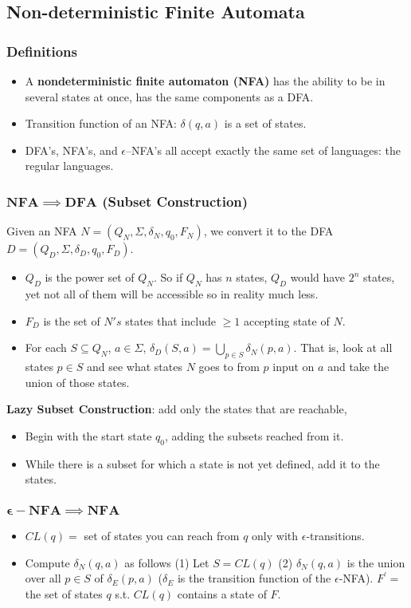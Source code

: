 \subsection{\color{ForestGreen}Non-deterministic Finite Automata}
\subsubsection{Definitions}
\begin{itemize}
    \item A \textbf{nondeterministic finite automaton (NFA)} has the ability to be in several states at once, has the same components as a DFA.
    \item Transition function of an NFA: $\delta(q, a)$ is a set of states.
    \item DFA’s, NFA’s, and $\epsilon$–NFA’s all accept exactly the same set of languages: the regular languages.
\end{itemize}
\subsubsection{$\mathbf{NFA \implies DFA}$ (Subset Construction)}
Given an NFA $N = (Q_N, \Sigma, \delta_N, q_0, F_N)$, we convert it to the DFA $D = (Q_D, \Sigma, \delta_D, q_0, F_D) $. 
\begin{itemize}
    \item $Q_D$ is the power set of $Q_N$. So if $Q_N$ has $n$ states, $Q_D$ would have $2^n$ states, yet not all of them will be accessible so in reality much less.
    \item $F_D$ is the set of $N's$ states that include $\geq 1$ accepting state of $N$.
    \item For each $S \subseteq Q_N$, $a\in \Sigma$, $\delta _D (S, a) = \bigcup_{p \in S} \delta_N (p, a).$ That is, look at all states $p \in S$ and see what states $N$ goes to from $p$ input on $a$ and take the union of those states.
\end{itemize}
\textbf{Lazy Subset Construction}: add only the states that are reachable,
\begin{itemize}
    \item Begin with the start state $q_0$, adding the subsets reached from it. 
    \item While there is a subset for which a state is not yet defined, add it to the states. 
\end{itemize}
\subsubsection{$\mathbf{\epsilon-NFA \implies NFA}$}
\begin{itemize}
    \item $CL(q) =$ set of states you can reach from $q$ only with $\epsilon$-transitions.
    \item Compute $\delta_N(q, a)$ as follows (1) Let $S = CL(q)$ (2) $\delta_N(q, a)$ is the union over all $p \in S$ of $\delta_E(p, a)$ ($\delta_E$ is the transition function of the $\epsilon$-NFA). $F^\prime =$ the set of states $q$ s.t. $CL(q)$ contains a state of $F$.
\end{itemize}